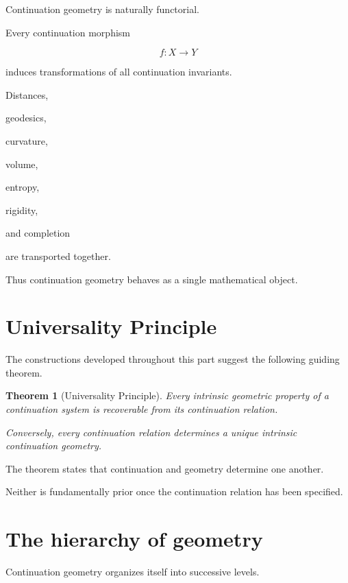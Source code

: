 \documentclass[13pt,openany]{book}
\theoremstyle{plain}
\newtheorem{theorem}{Theorem}[chapter]
\theoremstyle{definition}
\begin{document}
Continuation geometry is naturally functorial.

Every continuation morphism

\[
f:X\rightarrow Y
\]

induces transformations of all continuation invariants.

Distances,

geodesics,

curvature,

volume,

entropy,

rigidity,

and completion

are transported together.

Thus continuation geometry behaves as a single mathematical object.


\section{Universality Principle}

The constructions developed throughout this part suggest the following guiding theorem.

\begin{theorem}[Universality Principle]

Every intrinsic geometric property of a continuation system is recoverable from its continuation relation.

Conversely, every continuation relation determines a unique intrinsic continuation geometry.

\end{theorem}

The theorem states that continuation and geometry determine one another.

Neither is fundamentally prior once the continuation relation has been specified.


\section{The hierarchy of geometry}

Continuation geometry organizes itself into successive levels.
\end{document}
